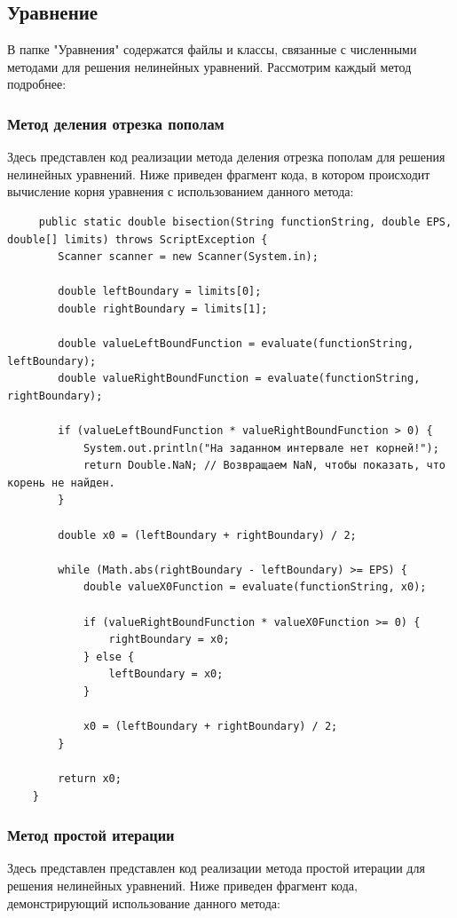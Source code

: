 \documentclass[12pt]{article}
\begin{document}
    \subsection{Уравнение}
    В папке "Уравнения" содержатся файлы и классы, связанные с численными методами для решения нелинейных уравнений.
    Рассмотрим каждый метод подробнее:

    \subsubsection{Метод деления отрезка пополам}
    Здесь представлен код реализации метода деления отрезка пополам для решения нелинейных уравнений.
    Ниже приведен фрагмент кода, в котором происходит вычисление корня уравнения с использованием данного метода:

    \begin{verbatim}
     public static double bisection(String functionString, double EPS, double[] limits) throws ScriptException {
        Scanner scanner = new Scanner(System.in);

        double leftBoundary = limits[0];
        double rightBoundary = limits[1];

        double valueLeftBoundFunction = evaluate(functionString, leftBoundary);
        double valueRightBoundFunction = evaluate(functionString, rightBoundary);

        if (valueLeftBoundFunction * valueRightBoundFunction > 0) {
            System.out.println("На заданном интервале нет корней!");
            return Double.NaN; // Возвращаем NaN, чтобы показать, что корень не найден.
        }

        double x0 = (leftBoundary + rightBoundary) / 2;

        while (Math.abs(rightBoundary - leftBoundary) >= EPS) {
            double valueX0Function = evaluate(functionString, x0);

            if (valueRightBoundFunction * valueX0Function >= 0) {
                rightBoundary = x0;
            } else {
                leftBoundary = x0;
            }

            x0 = (leftBoundary + rightBoundary) / 2;
        }

        return x0;
    }
    \end{verbatim}

    \subsubsection{Метод простой итерации}
    Здесь представлен представлен код реализации метода простой итерации для решения нелинейных уравнений. Ниже приведен фрагмент кода, демонстрирующий использование данного метода:
\end{document}
